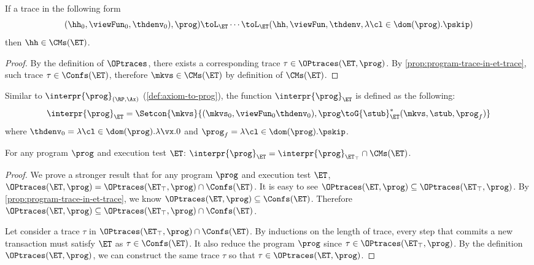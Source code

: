 \begin{corollary}
If a trace in the following form
\[
    (\hh_{0}, \viewFun_{0}, \thdenv_{0}), \prog) \toL_{\ET} \cdots \toL_{\ET} 
    (\hh, \viewFun, \thdenv, \lambda \cl \in \dom(\prog). \pskip)
\]
then $\hh \in \CMs(\ET)$.
\end{corollary}
\begin{proof}
    By the definition of \( \OPtraces \), 
    there exists a corresponding trace \( \tau \in \OPtraces(\ET, \prog) \).
    By \cref{prop:program-trace-in-et-trace}, such trace \( \tau \in \Confs(\ET) \),
    therefore \( \mkvs \in \CMs(\ET)\) by definition of \( \CMs(\ET) \).
\end{proof}

Similar to \( \interpr{\prog}_{(\RP,\Ax)} \) (\cref{def:axiom-to-prog}), the function \( \interpr{\prog}_{\ET} \) is defined as the following:
\[
    \interpr{\prog}_{\ET} = \Setcon{ \mkvs }{ (\mkvs_{0}, \viewFun_0 \thdenv_{0} ), \prog \toG{\stub}_{\ET}^{\ast} (\mkvs, \stub, \prog_{f}) }
\]
where $\thdenv_{0} = \lambda \cl \in \dom(\prog).\lambda \vx.0$ and $\prog_{f} = \lambda \cl \in \dom(\prog).\pskip$.

\begin{proposition}
    \label{thm:consistency-intersect-permissive}
    For any program $\prog$ and execution test $\ET$:
    \( \interpr{\prog}_{\ET} = \interpr{\prog}_{\ET_\top}  \cap \CMs(\ET) \).
\end{proposition}
\begin{proof}
    We prove a stronger result that for any program $\prog$ and execution test $\ET$, $\OPtraces(\ET, \prog) = \OPtraces(\ET_{\top}, \prog) \cap \Confs(\ET)$.
    It is easy to see \(\OPtraces(\ET, \prog) \subseteq \OPtraces(\ET_\top, \prog) \).
    By \cref{prop:program-trace-in-et-trace}, we know \( \OPtraces(\ET, \prog) \subseteq \Confs(\ET)\).
    Therefore \(  \OPtraces(\ET, \prog) \subseteq \OPtraces(\ET_\top, \prog) \cap \Confs(\ET) \).

    Let consider a trace \( \tau \) in \( \OPtraces(\ET_\top, \prog) \cap \Confs(\ET) \).
    By inductions on the length of trace, 
    every step that commits a new transaction  must satisfy \( \ET \) as \( \tau \in \Confs(\ET) \).
    It also reduce the program \( \prog \) since \( \tau \in \OPtraces(\ET_\top, \prog) \).
    By the definition \( \OPtraces(\ET, \prog) \), we can construct the same trace \( \tau \) so that \( \tau \in \OPtraces(\ET, \prog) \).
\end{proof}
